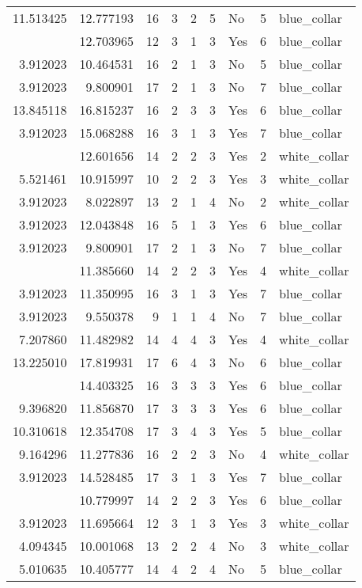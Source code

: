 \documentclass[
]{article}
\begin{document}
\begin{longtable}[t]{rrrrrllrl}
11.513425 & 12.777193 & 16 & 3 & 2 & 5 & No & 5 & blue\_collar\\
\addlinespace
3.912023 & 12.703965 & 12 & 3 & 1 & 3 & Yes & 6 & blue\_collar\\
3.912023 & 10.464531 & 16 & 2 & 1 & 3 & No & 5 & blue\_collar\\
3.912023 & 9.800901 & 17 & 2 & 1 & 3 & No & 7 & blue\_collar\\
13.845118 & 16.815237 & 16 & 2 & 3 & 3 & Yes & 6 & blue\_collar\\
3.912023 & 15.068288 & 16 & 3 & 1 & 3 & Yes & 7 & blue\_collar\\
\addlinespace
8.306472 & 12.601656 & 14 & 2 & 2 & 3 & Yes & 2 & white\_collar\\
5.521461 & 10.915997 & 10 & 2 & 2 & 3 & Yes & 3 & white\_collar\\
3.912023 & 8.022897 & 13 & 2 & 1 & 4 & No & 2 & white\_collar\\
3.912023 & 12.043848 & 16 & 5 & 1 & 3 & Yes & 6 & blue\_collar\\
3.912023 & 9.800901 & 17 & 2 & 1 & 3 & No & 7 & blue\_collar\\
\addlinespace
5.940171 & 11.385660 & 14 & 2 & 2 & 3 & Yes & 4 & white\_collar\\
3.912023 & 11.350995 & 16 & 3 & 1 & 3 & Yes & 7 & blue\_collar\\
3.912023 & 9.550378 & 9 & 1 & 1 & 4 & No & 7 & blue\_collar\\
7.207860 & 11.482982 & 14 & 4 & 4 & 3 & Yes & 4 & white\_collar\\
13.225010 & 17.819931 & 17 & 6 & 4 & 3 & No & 6 & blue\_collar\\
\addlinespace
13.815561 & 14.403325 & 16 & 3 & 3 & 3 & Yes & 6 & blue\_collar\\
9.396820 & 11.856870 & 17 & 3 & 3 & 3 & Yes & 6 & blue\_collar\\
10.310618 & 12.354708 & 17 & 3 & 4 & 3 & Yes & 5 & blue\_collar\\
9.164296 & 11.277836 & 16 & 2 & 2 & 3 & No & 4 & white\_collar\\
3.912023 & 14.528485 & 17 & 3 & 1 & 3 & Yes & 7 & blue\_collar\\
\addlinespace
10.597884 & 10.779997 & 14 & 2 & 2 & 3 & Yes & 6 & blue\_collar\\
3.912023 & 11.695664 & 12 & 3 & 1 & 3 & Yes & 3 & white\_collar\\
4.094345 & 10.001068 & 13 & 2 & 2 & 4 & No & 3 & white\_collar\\
5.010635 & 10.405777 & 14 & 4 & 2 & 4 & No & 5 & blue\_collar\\

\end{longtable}
\end{document}
